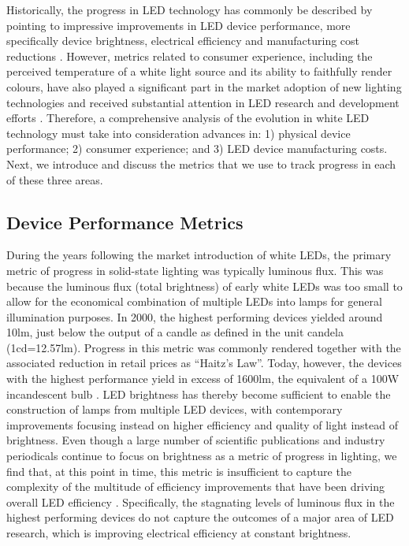 \documentclass[journal=jacsat,manuscript=article]{achemso}
\begin{document}
Historically, the progress in LED technology has commonly be described by pointing to impressive improvements in LED device performance, more specifically device brightness, electrical efficiency and manufacturing cost reductions \cite{Taki2019}. However, metrics related to consumer experience, including the perceived temperature of a white light source and its ability to faithfully render colours, have also played a significant part in the market adoption of new lighting technologies \cite{Menanteau2000,Sandahl2006,CAIRD2008,murphy2012governing} and received substantial attention in LED research and development efforts \cite{azevedo2009transition,cho2017white}. Therefore, a comprehensive analysis of the evolution in white LED technology must take into consideration advances in: 1) physical device performance; 2) consumer experience; and 3) LED device manufacturing costs. Next, we introduce and discuss the metrics that we use to track progress in each of these three areas.

\subsection{Device Performance Metrics}
\label{sec:device_performance_metrics}

During the years following the market introduction of white LEDs, the primary metric of progress in solid-state lighting was typically luminous flux. This was because the luminous flux (total brightness) of early white LEDs was too small to allow for the economical combination of multiple LEDs into lamps for general illumination purposes. In 2000, the highest performing devices yielded around 10lm, just below the output of a candle as defined in the unit candela (1cd=12.57lm)\cite{haitz2011solid}. Progress in this metric was commonly rendered together with the associated reduction in retail prices as “Haitz’s Law”\cite{haitz1999case,haitz2011solid}. Today, however, the devices with the highest performance yield in excess of 1600lm, the equivalent of a 100W incandescent bulb \cite{cree2020bright}. LED brightness has thereby become sufficient to enable the construction of lamps from multiple LED devices, with contemporary improvements focusing instead on higher efficiency and quality of light instead of brightness. Even though a large number of scientific publications and industry periodicals continue to focus on brightness as a metric of progress in lighting, we find that, at this point in time, this metric is insufficient to capture the complexity of the multitude of efficiency improvements that have been driving overall LED efficiency \cite{weinold2021compound}. Specifically, the stagnating levels of luminous flux in the highest performing devices do not capture the outcomes of a major area of LED research, which is improving electrical efficiency at constant brightness.
\end{document}
